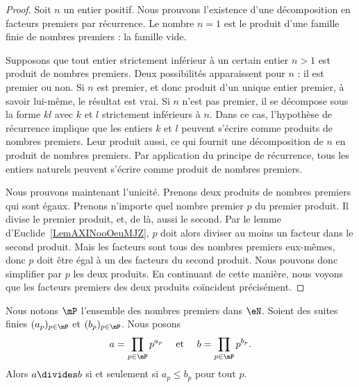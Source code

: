 \begin{proof}
    Soit \( n\) un entier positif. Nous prouvons l'existence d'une décomposition en facteurs premiers par récurrence. Le nombre \( n=1\) est le produit d'une famille finie de nombres premiers : la famille vide.

    Supposons que tout entier strictement inférieur à un certain entier \( n>1\) est produit de nombres premiers. Deux possibilités apparaissent pour $n$ : il est premier ou non. Si $n$ est premier, et donc produit d'un unique entier premier, à savoir lui-même, le résultat est vrai. Si \( n\) n'est pas premier, il se décompose sous la forme $kl$ avec $k$ et $l$ strictement inférieurs à $n$. Dans ce cas, l'hypothèse de récurrence implique que les entiers $k$ et $l$ peuvent s'écrire comme produits de nombres premiers. Leur produit aussi, ce qui fournit une décomposition de $n$ en produit de nombres premiers.  Par application du principe de récurrence, tous les entiers naturels peuvent s'écrire comme produit de nombres premiers.

    Nous prouvons maintenant l'unicité. Prenons deux produits de nombres premiers qui sont égaux. Prenons n'importe quel nombre premier $p$ du premier produit. Il divise le premier produit, et, de là, aussi le second. Par le lemme d'Euclide~\ref{LemAXINooOeuMJZ}, $p$ doit alors diviser au moins un facteur dans le second produit. Mais les facteurs sont tous des nombres premiers eux-mêmes, donc $p$ doit être égal à un des facteurs du second produit. Nous pouvons donc simplifier par $p$ les deux produits. En continuant de cette manière, nous voyons que les facteurs premiers des deux produits coïncident précisément.
\end{proof}

\begin{lemma}        \label{LEMooDTQQooYoJABt}
    Nous notons \( \mP\) l'ensemble des nombres premiers dans \( \eN\). Soient des suites finies \( (a_p)_{p\in \mP}\) et \( (b_p)_{p\in \mP}\). Nous posons
    \begin{equation}
        \begin{aligned}[]
            a&=\prod_{ p\in\mP}p^{a_p}&\text{ et }&&b=\prod_{ p\in \mP}p^{b_p}.
        \end{aligned}
    \end{equation}
    Alors \( a\divides b\) si et seulement si \( a_p\leq b_p\) pour tout \( p\).
\end{lemma}

